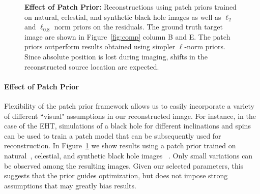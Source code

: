 \begin{figure}[b]
\begin{center}
\begin{tabular}{c c c c c}
 			
 			
 			
 		\end{tabular}
 		\caption{ \footnotesize{{\bf Effect of Patch Prior:} Reconstructions using patch priors trained on natural, celestial, and synthetic black hole images as well as $\ell_2$ and $\ell_{0.8}$ norm priors on the residuals. The ground truth target image are shown in Figure~\ref{fig:comp} column B and E. 
 				The patch priors outperform results obtained using simpler $\ell$-norm priors. 
 				Since absolute position is lost during imaging, shifts in the reconstructed source location are expected. 
 				} }
 		\label{fig:patchprior}
 	\end{center}
 \end{figure}
 
 
 
 
 
 \paragraph{Effect of Patch Prior} Flexibility of the patch prior framework allows us to easily incorporate a variety of different ``visual" assumptions in our reconstructed image.
 For instance, in the case of the EHT, simulations of a black hole for different inclinations and spins can be used to train a patch model that can be subsequently used for reconstruction. 
 In Figure~\ref{fig:patchprior} we show results using a patch prior trained on natural~\cite{martin2001database}, celestial, and synthetic black hole images%
 ~\cite{avery}. Only small variations can be observed among the resulting images.
 Given our selected parameters, this suggests that the prior guides optimization, but does not impose strong assumptions that may greatly bias results.
  
